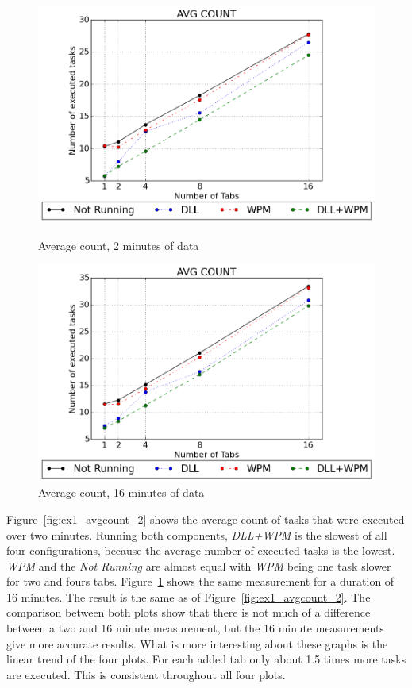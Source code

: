 \begin{figure}[h]
	\centering
    \includegraphics[width=\textwidth,height=0.45\textheight,keepaspectratio]{Evaluation/experiment1/AVG-COUNT-2.png}
    \caption{Average count, 2 minutes of data}
    \label{fig:ex1_avgcount_2}

  	\vspace*{\floatsep}
  	
    \includegraphics[width=\textwidth,height=0.45\textheight,keepaspectratio]{Evaluation/experiment1/AVG-COUNT-16.png}
    \caption{Average count, 16 minutes of data}
    \label{fig:ex1_avgcount_16}
\end{figure}
Figure~\ref{fig:ex1_avgcount_2} shows the average count of tasks that were executed over two minutes. Running both components, \emph{\gls{DLL}+\gls{WPM}} is the slowest of all four configurations, because the average number of executed tasks is the lowest. \emph{WPM} and the \emph{Not Running} are almost equal with \emph{\gls{WPM}} being one task slower for two and fours tabs. Figure~\ref{fig:ex1_avgcount_16} shows the same measurement for a duration of 16 minutes. The result is the same as of Figure~\ref{fig:ex1_avgcount_2}. The comparison between both plots show that there is not much of a difference between a two and 16 minute measurement, but the 16 minute measurements give more accurate results. What is more interesting about these graphs is the linear trend of the four plots. For each added tab only about 1.5 times more tasks are executed. This is consistent throughout all four plots.
